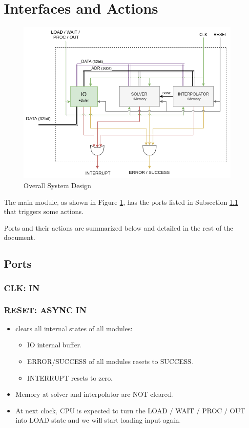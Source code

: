 \documentclass[12pt]{report}
\begin{document}
\section{Interfaces and Actions}
\begin{center}
    \begin{figure}[hp]
        \centering
        \includegraphics[width=\textwidth]{d1}
        \caption{Overall System Design}
        \label{fig:overall}
    \end{figure}
\end{center}

The main module, as shown in Figure \ref{fig:overall}, has the ports listed in Subsection \ref{sec:interface:ports} that triggers some actions. 

Ports and their actions are summarized below and detailed in the rest of the document.

\subsection{Ports}
\label{sec:interface:ports}

\subsubsection{CLK: IN}

\subsubsection{RESET: ASYNC IN}
\begin{itemize}
    \item clears all internal states of all modules:
    \begin{itemize}
        \item IO internal buffer.
        \item ERROR/SUCCESS of all modules resets to SUCCESS.
        \item INTERRUPT resets to zero.
    \end{itemize}
    \item Memory at solver and interpolator are NOT cleared.
    \item At next clock, CPU is expected to turn the {LOAD / WAIT / PROC / OUT} into {LOAD} state and we will start loading input again.
\end{itemize}
\end{document}
